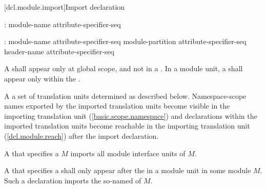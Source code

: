 [dcl.module.import]{Import declaration}%

\begin{std.txt}\color{addclr}
\begin{before}
  \begin{bnf}\color{addclr}
    :\br
       module-name attribute-specifier-seq\opt {} \terminal{;}
  \end{bnf}
\end{before}\begin{after}
  \begin{bnf}\color{addclr}
    :\br
      \opt{}  module-name attribute-specifier-seq\opt {} \terminal{;}\br
      \opt{}  module-partition attribute-specifier-seq\opt {} \terminal{;}\br
      \opt{}  header-name attribute-specifier-seq\opt {} \terminal{;}
  \end{bnf}
\end{after}

  \resetalinea[0]
  \alinea
  A  shall appear only at
  global scope, and not in a .
  In a module unit, a  shall
  appear only within the .

  \alinea
  A   a set of
  translation units determined as described below.
  \enternote
  Namespace-scope names exported by the imported translation units
  become visible in the importing translation unit (\ref{basic.scope.namespace})
  and declarations within the imported translation units become reachable
  in the importing translation unit (\ref{dcl.module.reach})
  after the import declaration.
  \exitnote

  \alinea
  A  that specifies
  a  $M$
  imports all module interface units of $M$.

  \alinea
  A  that specifies
  a  shall only appear after
  the  in a module unit in
  some module $M$.
  Such a declaration imports the so-named
   of $M$.


\end{std.txt}
